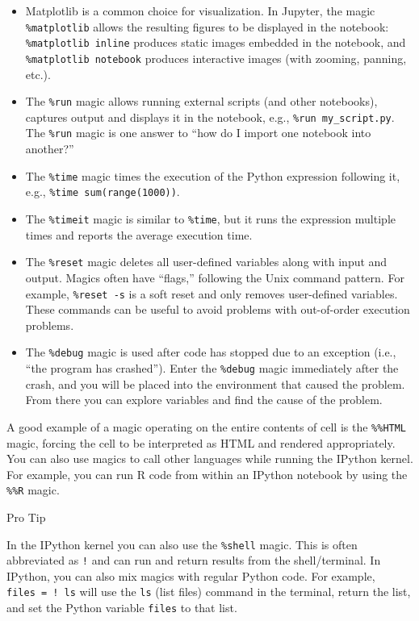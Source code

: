 \documentclass[]{book}
\let\BeginKnitrBlock\begin \let\EndKnitrBlock\end
\begin{document}
\begin{itemize}
\item
  Matplotlib is a common choice for visualization. In Jupyter, the
  magic \texttt{\%matplotlib} allows the resulting figures to
  be displayed in the notebook: \texttt{\%matplotlib\ inline} produces
  static images embedded in the notebook, and \texttt{\%matplotlib\ notebook} produces interactive images (with zooming, panning, etc.).
\item
  The \texttt{\%run} magic allows running external scripts (and other
  notebooks), captures output and displays it in the notebook,
  e.g., \texttt{\%run\ my\_script.py}. The \texttt{\%run} magic is one answer to ``how
  do I import one notebook into another?''
\item
  The \texttt{\%time} magic times the execution of the Python expression following it, e.g., \texttt{\%time\ sum(range(1000))}.
\item
  The \texttt{\%timeit} magic is similar to \texttt{\%time}, but it
  runs the expression multiple times and reports the average
  execution time.
\item
  The \texttt{\%reset} magic deletes all user-defined variables along with input and
  output. Magics often have ``flags,'' following the Unix command
  pattern. For example, \texttt{\%reset\ -s} is a soft reset and only removes
  user-defined variables. These commands can be useful to avoid problems
  with out-of-order execution problems.
\item
  The \texttt{\%debug} magic is used after code has stopped due to an
  exception (i.e., ``the program has crashed''). Enter the \texttt{\%debug}
  magic immediately after the crash, and you will be placed into the
  environment that caused the problem. From there you can explore
  variables and find the cause of the problem.
\end{itemize}

A good example of a magic operating on the entire contents of cell is
the \texttt{\%\%HTML} magic, forcing the cell to be interpreted as HTML
and rendered appropriately. You can also use magics to call other
languages while running the IPython kernel. For example, you can run
R code from within an IPython notebook by using the \texttt{\%\%R} magic.

\BeginKnitrBlock{rmdnote}
Pro Tip

In the IPython kernel you can also use the \texttt{\%shell} magic. This is
often abbreviated as \texttt{!} and can run and return results from the
shell/terminal. In IPython, you can also mix magics with regular
Python code. For example, \texttt{files\ =\ !\ ls} will use the \texttt{ls} (list
files) command in the terminal, return the list, and set the
Python variable \texttt{files} to that list.
\EndKnitrBlock{rmdnote}
\end{document}
